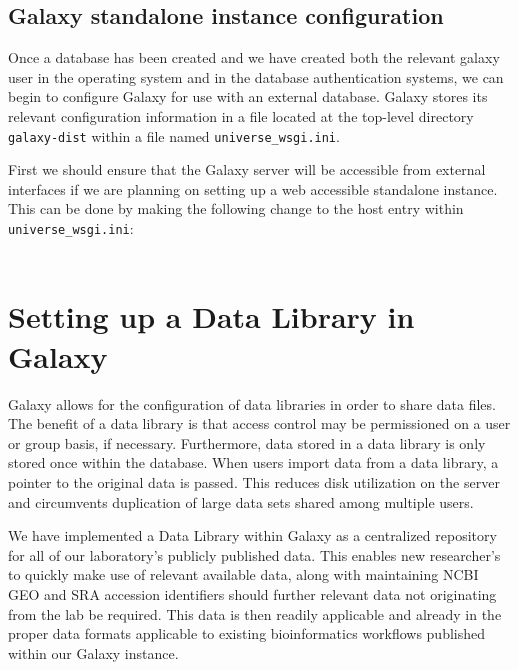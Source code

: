 \documentclass[a4paper,10pt]{article}
\begin{document}
\subsection{Galaxy standalone instance configuration}
Once a database has been created and we have created both the relevant galaxy user in the operating system and in the database authentication systems, we can begin to configure Galaxy for use with an external database.
Galaxy stores its relevant configuration information in a file located at the top-level directory \texttt{galaxy-dist} within a file named \texttt{universe\_wsgi.ini}.

First we should ensure that the Galaxy server will be accessible from external interfaces if we are planning on setting up a web accessible standalone instance.  This can be done by making the following change to the host entry within \texttt{universe\_wsgi.ini}:
\\\\

\section{Setting up a Data Library in Galaxy}
Galaxy allows for the configuration of data libraries in order to share data files.  The benefit of a data library is that access control may be permissioned on a user or group basis, if necessary.  Furthermore, data stored in a data library is only stored once within the database.  When users import data from a data library, a pointer to the original data is passed.  This reduces disk utilization on the server and circumvents duplication of large data sets shared among multiple users.

We have implemented a Data Library within Galaxy as a centralized repository for all of our laboratory's publicly published data.  This enables new researcher's to quickly make use of relevant available data, along with maintaining NCBI GEO and SRA accession identifiers should further relevant data not originating from the lab be required.  This data is then readily applicable and already in the proper data formats applicable to existing bioinformatics workflows published within our Galaxy instance.
\end{document}
